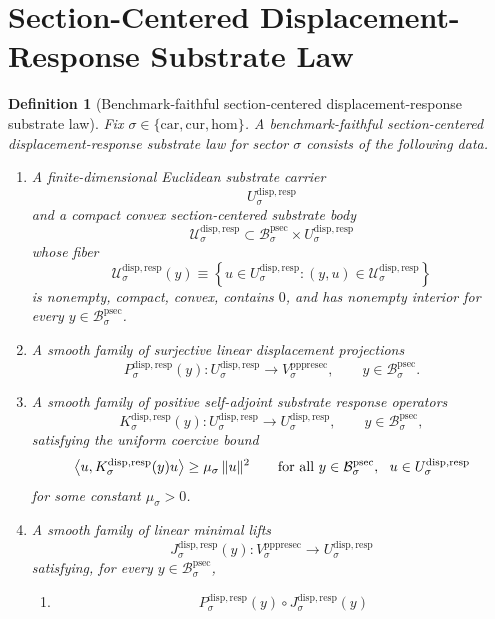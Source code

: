 \documentclass[11pt]{article}
\newcommand{\Car}{\mathrm{car}}
\newcommand{\Cur}{\mathrm{cur}}
\newcommand{\Hom}{\mathrm{hom}}
\newcommand{\ProtoSectionBody}[1]{\mathcal B_{#1}^{\mathrm{psec}}}
\newcommand{\PrePreProtoSectionVertical}[1]{V_{#1}^{\mathrm{pppresec}}}
\newcommand{\SubstrateCarrier}[1]{U_{#1}^{\mathrm{disp,resp}}}
\newcommand{\SubstrateBody}[1]{\mathcal U_{#1}^{\mathrm{disp,resp}}}
\newcommand{\SubstrateProjection}[1]{P_{#1}^{\mathrm{disp,resp}}}
\newcommand{\SubstrateOperator}[1]{K_{#1}^{\mathrm{disp,resp}}}
\newcommand{\SubstrateLift}[1]{J_{#1}^{\mathrm{disp,resp}}}
\newtheorem{definition}{Definition}
\begin{document}
\section{Section-Centered Displacement-Response Substrate Law}

\begin{definition}[Benchmark-faithful section-centered displacement-response substrate law]
\label{def:law}
Fix \(\sigma\in\{\Car,\Cur,\Hom\}\). A \emph{benchmark-faithful section-centered displacement-response substrate law} for sector \(\sigma\) consists of the following data.
\begin{enumerate}
    \item A finite-dimensional Euclidean substrate carrier
    \[
    \SubstrateCarrier{\sigma}
    \]
    and a compact convex section-centered substrate body
    \[
    \SubstrateBody{\sigma}
    \subset
    \ProtoSectionBody{\sigma}\times\SubstrateCarrier{\sigma}
    \]
    whose fiber
    \[
    \SubstrateBody{\sigma}(y)
    \equiv
    \left\{
    u\in\SubstrateCarrier{\sigma}:(y,u)\in\SubstrateBody{\sigma}
    \right\}
    \]
    is nonempty, compact, convex, contains \(0\), and has nonempty interior for every \(y\in\ProtoSectionBody{\sigma}\).
    \item A smooth family of surjective linear displacement projections
    \[
    \SubstrateProjection{\sigma}(y):
    \SubstrateCarrier{\sigma}\to\PrePreProtoSectionVertical{\sigma},
    \qquad
    y\in\ProtoSectionBody{\sigma}.
    \]
    \item A smooth family of positive self-adjoint substrate response operators
    \[
    \SubstrateOperator{\sigma}(y):
    \SubstrateCarrier{\sigma}\to\SubstrateCarrier{\sigma},
    \qquad
    y\in\ProtoSectionBody{\sigma},
    \]
    satisfying the uniform coercive bound
    \begin{equation}
    \ev{u,\SubstrateOperator{\sigma}(y)u}
    \ge
    \mu_{\sigma}\,\|u\|^{2}
    \qquad
    \text{for all }
    y\in\ProtoSectionBody{\sigma},
    \ \ u\in\SubstrateCarrier{\sigma}
    \label{eq:coercive}
    \end{equation}
    for some constant \(\mu_{\sigma}>0\).
    \item A smooth family of linear minimal lifts
    \[
    \SubstrateLift{\sigma}(y):
    \PrePreProtoSectionVertical{\sigma}\to\SubstrateCarrier{\sigma}
    \]
    satisfying, for every \(y\in\ProtoSectionBody{\sigma}\),
    \begin{enumerate}
        \item
        \[
        \SubstrateProjection{\sigma}(y)\circ\SubstrateLift{\sigma}(y)
\]
\end{enumerate}
\end{enumerate}
\end{definition}
\end{document}
